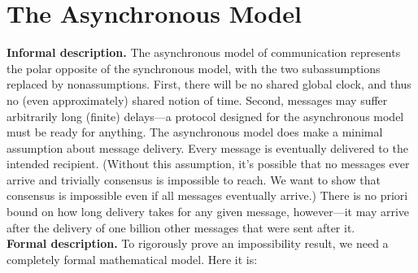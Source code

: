 \section{The Asynchronous Model}
\noindent
\textbf{Informal description.} The asynchronous model of communication represents the polar opposite of the synchronous model, with the two subassumptions replaced by nonassumptions. First, there will be no shared global clock, and thus no (even approximately)
shared notion of time. Second, messages may suffer arbitrarily long (finite) delays—a protocol designed for the asynchronous model must be ready for anything.
The asynchronous model does make a minimal assumption about message delivery. Every
message is eventually delivered to the intended recipient. (Without this assumption, it’s
possible that no messages ever arrive and trivially consensus is impossible to reach. We
want to show that consensus is impossible even if all messages eventually arrive.) There is
no priori bound on how long delivery takes for any given message, however—it may 
arrive after the delivery of one billion other messages that were sent after it.\\

\noindent
\textbf{Formal description.} To rigorously prove an impossibility result, we need a completely
formal mathematical model. Here it is:

